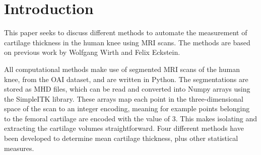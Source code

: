 \section{Introduction}
This paper seeks to discuss different methods to automate the measurement of cartilage thickness in the human knee using MRI scans. The methods are based on previous work by Wolfgang Wirth and Felix Eckstein. \cite{wirth2008technique}
\par\noindent
All computational methods make use of segmented MRI scans of the human knee, from the OAI dataset, and are written in Python. The segmentations are stored as MHD files, which can be read and converted into Numpy arrays using the SimpleITK library. These arrays map each point in the three-dimensional space of the scan to an integer encoding, meaning for example points belonging to the femoral cartilage are encoded with the value of 3. This makes isolating and extracting the cartilage volumes straightforward. Four different methods have been developed to determine mean cartilage thickness, plus other statistical measures.

